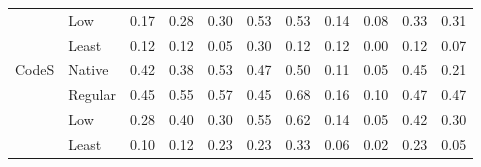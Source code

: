 \begin{tabular}{p{.9in}p{.5in}p{.3in}p{.3in}p{.3in}p{.3in}p{.3in}p{.3in}p{.3in}p{.3in}p{.3in}}
 & Low & 0.17 & 0.28 & 0.30 & 0.53 & 0.53 & 0.14 & 0.08 & 0.33 & 0.31 \\
 & Least & 0.12 & 0.12 & 0.05 & 0.30 & 0.12 & 0.12 & 0.00 & 0.12 & 0.07 \\
\cline{1-11}
\multirow[t]{4}{*}{CodeS} & Native & 0.42 & 0.38 & 0.53 & 0.47 & 0.50 & 0.11 & 0.05 & 0.45 & 0.21 \\
 & Regular & 0.45 & 0.55 & 0.57 & 0.45 & 0.68 & 0.16 & 0.10 & 0.47 & 0.47 \\
 & Low & 0.28 & 0.40 & 0.30 & 0.55 & 0.62 & 0.14 & 0.05 & 0.42 & 0.30 \\
 & Least & 0.10 & 0.12 & 0.23 & 0.23 & 0.33 & 0.06 & 0.02 & 0.23 & 0.05 \\
\cline{1-11}
\bottomrule
\end{tabular}
